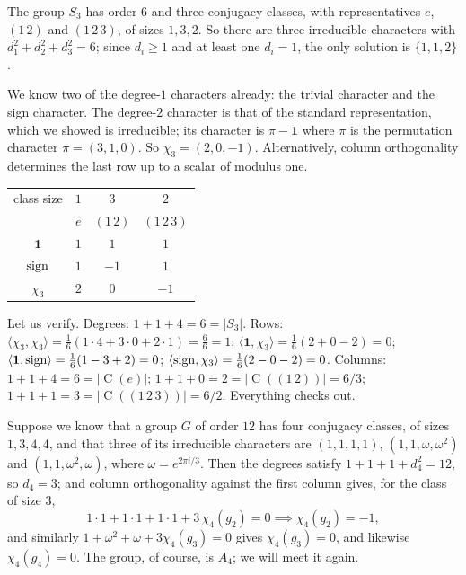 \documentclass[a4paper]{scrartcl}
\newcommand{\Cent}{\operatorname{C}}
\newcommand{\ip}[2]{\langle #1, #2 \rangle}
\begin{document}
\begin{example}[$S_3$]
	The group $S_3$ has order $6$ and three conjugacy classes, with representatives $e$, $(1\,2)$ and $(1\,2\,3)$, of sizes $1, 3, 2$. So there are three irreducible characters with $d_1^2 + d_2^2 + d_3^2 = 6$; since $d_i \geq 1$ and at least one $d_i = 1$, the only solution is $\{1,1,2\}$.

	We know two of the degree-$1$ characters already: the trivial character and the sign character. The degree-$2$ character is that of the standard representation, which we showed is irreducible; its character is $\pi - \mathbf 1$ where $\pi$ is the permutation character $\pi = (3,1,0)$. So $\chi_3 = (2, 0, -1)$. Alternatively, column orthogonality determines the last row up to a scalar of modulus one.
	\begin{center}
	\renewcommand{\arraystretch}{1.25}
	\setlength{\tabcolsep}{10pt}
	\begin{tabular}{c|ccc}
	\toprule
	class size & $1$ & $3$ & $2$\\
	 & $e$ & $(1\,2)$ & $(1\,2\,3)$\\
	\midrule
	$\mathbf 1$ & $1$ & $1$ & $1$\\
	$\operatorname{sign}$ & $1$ & $-1$ & $1$\\
	$\chi_3$ & $2$ & $0$ & $-1$\\
	\bottomrule
	\end{tabular}
	\end{center}
	Let us verify. Degrees: $1 + 1 + 4 = 6 = |S_3|$. Rows: $\ip{\chi_3}{\chi_3} = \frac16(1\cdot 4 + 3\cdot 0 + 2\cdot 1) = \frac{6}{6} = 1$; $\ip{\mathbf1}{\chi_3} = \frac16(2 + 0 - 2) = 0$; $\ip{\mathbf1}{\sign} = \frac16(1 - 3 + 2) = 0$; $\ip{\sign}{\chi_3} = \frac16(2 - 0 - 2) = 0$. Columns: $1 + 1 + 4 = 6 = |\Cent(e)|$; $1 + 1 + 0 = 2 = |\Cent((1\,2))| = 6/3$; $1+1+1 = 3 = |\Cent((1\,2\,3))| = 6/2$. Everything checks out.
\end{example}

\begin{example}
	Suppose we know that a group $G$ of order $12$ has four conjugacy classes, of sizes $1,3,4,4$, and that three of its irreducible characters are $(1,1,1,1)$, $(1,1,\omega,\omega^2)$ and $(1,1,\omega^2,\omega)$, where $\omega = e^{2\pi i/3}$. Then the degrees satisfy $1+1+1+d_4^2 = 12$, so $d_4 = 3$; and column orthogonality against the first column gives, for the class of size $3$,
	$$1\cdot 1 + 1\cdot 1 + 1\cdot 1 + 3\,\chi_4(g_2) = 0 \implies \chi_4(g_2) = -1,$$
	and similarly $1 + \omega^2 + \omega + 3\chi_4(g_3) = 0$ gives $\chi_4(g_3) = 0$, and likewise $\chi_4(g_4) = 0$. The group, of course, is $A_4$; we will meet it again.
\end{example}
\end{document}
